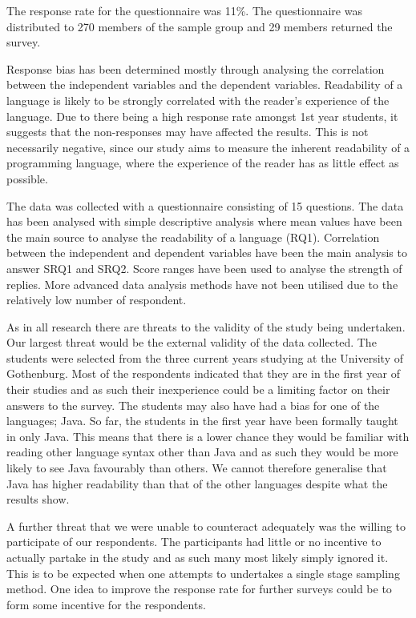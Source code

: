 \documentclass[times, 10pt,twocolumn]{IEEEtran}
\begin{document}
The response rate for the questionnaire was 11\%. The questionnaire was distributed to 270 members of the sample group and 29 members returned the survey.
\newline

Response bias has been determined mostly through analysing the correlation between the independent variables and the dependent variables. Readability of a language is likely to be strongly correlated with the reader's experience of the language. Due to there being a high response rate amongst 1st year students, it suggests that the non-responses may have affected the results. This is not necessarily negative, since our study aims to measure the inherent readability of a programming language, where the experience of the reader has as little effect as possible.
\newline

The data was collected with a questionnaire consisting of 15 questions. The data has been analysed with simple descriptive analysis where mean values have been the main source to analyse the readability of a language (RQ1). Correlation between the independent and dependent variables have been the main analysis to answer SRQ1 and SRQ2. Score ranges have been used to analyse the strength of replies. More advanced data analysis methods have not been utilised due to the relatively low number of respondent. 

As in all research there are threats to the validity of the study being undertaken. Our largest threat would be the external validity of the data collected. The students were selected from the three current years studying at the University of Gothenburg. Most of the respondents indicated that they are in the first year of their studies and as such their inexperience could be a limiting factor on their answers to the survey. The students may also have had a bias for one of the languages; Java. So far, the students in the first year have been formally taught in only Java. This means that there is a lower chance they would be familiar with reading other language syntax other than Java and as such they would be more likely to see Java favourably than others. We cannot therefore generalise that Java has higher readability than that of the other languages despite what the results show. 
\newline

A further threat that we were unable to counteract adequately was the willing to participate of our respondents. The participants had little or no incentive to actually partake in the study and as such many most likely simply ignored it. This is to be expected when one attempts to undertakes a single stage sampling method. One idea to improve the response rate for further surveys could be to form some incentive for the respondents.
\newline
\end{document}
